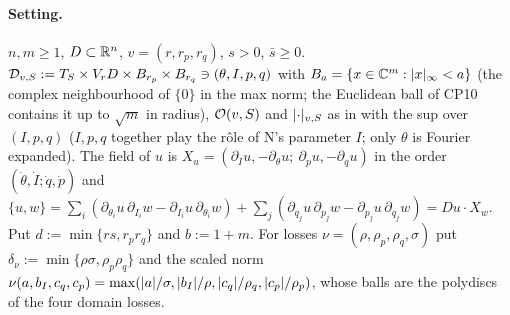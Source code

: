 \paragraph{Setting.} $n,m\ge1$, $D\subset\mathbb{R}^n$, $v=(r,r_p,r_q)$, $s>0$, $\bar s\ge0$. $\mathcal D_{v,S}:=T_S\times V_rD\times B_{r_p}\times B_{r_q}\ni(\theta,I,p,q)$ with $B_a=\{x\in\mathbb{C}^m:\lvert x\rvert_\infty<a\}$ (the complex neighbourhood of $\{0\}$ in the max norm; the Euclidean ball of CP10 contains it up to $\sqrt m$ in radius), $\mathcal O(v,S)$ and $\lvert \cdot\rvert_{v,S}$ as in  with the sup over $(I,p,q)$ ($I,p,q$ together play the r\^ole of N's parameter $I$; only $\theta$ is Fourier expanded). The field of $u$ is $X_u=(\partial_Iu,-\partial_\theta u;\ \partial_pu,-\partial_qu)$ in the order $(\dot\theta,\dot I;\dot q,\dot p)$ and
$\{u,w\}=\sum_i(\partial_{\theta_i}u\,\partial_{I_i}w-\partial_{I_i}u\,\partial_{\theta_i}w)+\sum_j(\partial_{q_j}u\,\partial_{p_j}w-\partial_{p_j}u\,\partial_{q_j}w)=Du\cdot X_w$. Put $d:=\min\{rs,r_pr_q\}$ and $b:=1+m$.
For losses $\nu=(\rho,\rho_p,\rho_q,\sigma)$ put $\delta_\nu:=\min\{\rho\sigma,\rho_p\rho_q\}$ and the scaled norm $\nu(a,b_I,c_q,c_p)=\max(\lvert a\rvert/\sigma,\lvert b_I\rvert/\rho,\lvert c_q\rvert/\rho_q,\lvert c_p\rvert/\rho_p)$, whose balls are the polydiscs of the four domain losses.

